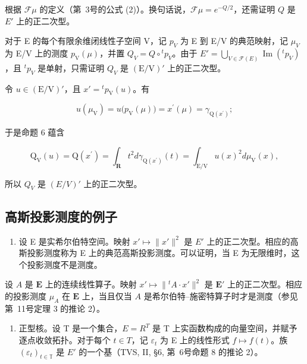 根据 \(\mathcal{F}\mu\) 的定义（第~3号的公式 (2)）。换句话说，\(\mathcal{F}\mu = e^{-Q/2}\)，还需证明 \(Q\) 是 \(E'\) 上的正二次型。

对于 E 的每个有限余维闭线性子空间 V，记 \(p_{V}\) 为 E 到 E/V 的典范映射，记 \(\mu_{V}\) 为 E/V 上的测度 \(p_{\mathrm{V}}(\mu)\)，并置 \(Q_{V} = Q \circ {}^{t} p_{V}\)。由于 \(E' = \bigcup_{V \in \mathcal{F}(E)} \operatorname{Im}({}^{t} p_{V})\)，且 \({}^{t} p_{V}\) 是单射，只需证明 \(Q_{V}\) 是 \((\mathrm{E}/\mathrm{V})'\) 上的正二次型。

令 \(u \in (\mathrm{E}/\mathrm{V})'\)，且 \(x' = {}^{t} p_{\mathrm{V}}(u)\)。有

\[
u (\mu_ {\mathrm{V}}) = u \big (p _ {\mathrm{V}} (\mu) \big) = x ^ {\prime} (\mu) = \gamma_ {\mathrm{Q} (x ^ {\prime})};
\]

于是命题 6 蕴含

\[
\mathrm{Q} _ {\mathrm{V}} (u) = \mathrm{Q} (x ^ {\prime}) = \int_ {\mathbf {R}} t ^ {2} d \gamma_ {\mathrm{Q} (x ^ {\prime})} (t) = \int_ {\mathrm{E} / \mathrm{V}} u (x) ^ {2} d \mu_ {\mathrm{V}} (x),
\]

所以 \(Q_V\) 是 \((E/V)'\) 上的正二次型。

\subsection{高斯投影测度的例子}

\begin{enumerate}
\def\labelenumi{\arabic{enumi})}
\tightlist
\item
  设 E 是实希尔伯特空间。映射 \(x' \mapsto \|x'\|^2\) 是 \(E'\) 上的正二次型。相应的高斯投影测度称为 E 上的典范高斯投影测度。可以证明，当 E 为无限维时，这个投影测度不是测度。
\end{enumerate}

设 \(A\) 是 \(\mathbf{E}\) 上的连续线性算子。映射 \(x' \mapsto \|{}^{t} A \cdot x'\|^2\) 是 \(\mathbf{E}'\) 上的正二次型。相应的投影测度 \(\mu_A\) 在 \(\mathbf{E}\) 上，当且仅当 \(A\) 是希尔伯特--施密特算子时才是测度（参见第~11号定理 3 的推论 2）。

\begin{enumerate}
\def\labelenumi{\arabic{enumi})}
\setcounter{enumi}{1}
\tightlist
\item
  正型核。设 T 是一个集合，\(E = R^{T}\) 是 T 上实函数构成的向量空间，并赋予逐点收敛拓扑。对于每个 \(t \in T\)，记 \(\varepsilon_{t}\) 为 E 上的线性形式 \(f \mapsto f(t)\)。族 \((\varepsilon_{t})_{t \in \mathbb{T}}\) 是 \(E'\) 的一个基（TVS, II, §6, 第~6号命题 8 的推论 2）。
\end{enumerate}

